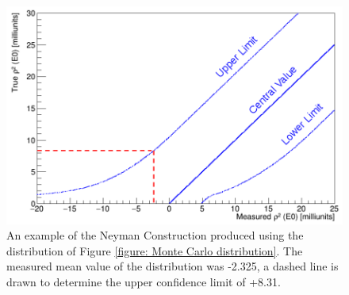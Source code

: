 \begin{figure}[!ht]
  \centering
  \includegraphics[width=\textwidth]{techniques_neyman.png}
  \caption[An example of the Neyman Construction produced using the distribution of Figure \ref{figure: Monte Carlo distribution}.]{An example of the Neyman Construction produced using the distribution of Figure \ref{figure: Monte Carlo distribution}. The measured mean value of the distribution was -2.325, a dashed line is drawn to determine the upper confidence limit of +8.31.}
  \label{figure: Neyman construction}
\end{figure}


\endinput

Any text after an \endinput is ignored.
You could put scraps here or things in progress.

JTS from Paper

{\it Experimental Details -}
A beam of 35.6\,MeV alpha particles with a typical intensity of 120\,ppA was delivered by the TRIUMF-ISAC-II superconducting linear accelerator to the TIGRESS spectrometer. The beam was incident on a self-supporting $^{110}$Pd target of 1.6\,mg/cm$^2$ with a 97.61\% isotopic enrichment. The target was positioned 8\,mm upstream of the nominal center of the TIGRESS spectrometer.
Two micron S3 silicon detectors of 140\,$\mu$m and 1000\,$\mu$m thickness were located downstream in a $\Delta E-E$ telescope configuration to detect and identify charged particles. Twelve of the TIGRESS high-purity germanium (HPGe) clover detectors were positioned around the target location to detect $\gamma$ rays. Four clovers were located at 45$^{\circ}$ with respect to the beam axis, and the remaining eight at 90$^{\circ}$. Each clover was fully Compton suppressed and positioned at a target-to-detector distance of 14.5\,cm in the `Optimized peak-to-total' configuration of the TIGRESS spectrometer \cite{Hackman14}.

